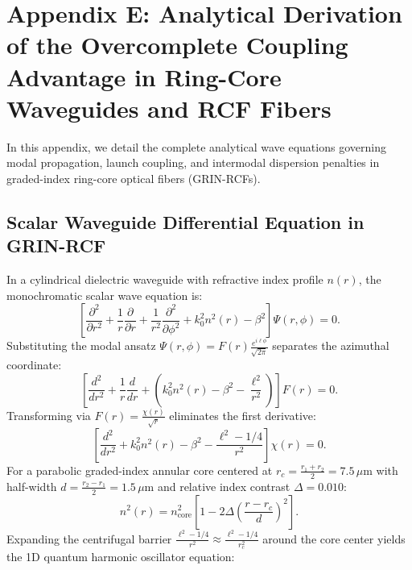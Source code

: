 \documentclass[11pt,a4paper]{article}
\begin{document}
\section{Appendix E: Analytical Derivation of the Overcomplete Coupling Advantage in Ring-Core Waveguides and RCF Fibers}
\label{app:waveguide}

In this appendix, we detail the complete analytical wave equations governing modal propagation, launch coupling, and intermodal dispersion penalties in graded-index ring-core optical fibers (GRIN-RCFs).

\subsection{Scalar Waveguide Differential Equation in GRIN-RCF}

In a cylindrical dielectric waveguide with refractive index profile $n(r)$, the monochromatic scalar wave equation is:
\begin{equation}
\left[ \frac{\partial^2}{\partial r^2} + \frac{1}{r} \frac{\partial}{\partial r} + \frac{1}{r^2} \frac{\partial^2}{\partial \phi^2} + k_0^2 n^2(r) - \beta^2 \right] \Psi(r, \phi) = 0.
\label{eq:app_scalar_helmholtz}
\end{equation}
Substituting the modal ansatz $\Psi(r, \phi) = F(r) \frac{e^{i \ell \phi}}{\sqrt{2\pi}}$ separates the azimuthal coordinate:
\begin{equation}
\left[ \frac{d^2}{dr^2} + \frac{1}{r} \frac{d}{dr} + \left( k_0^2 n^2(r) - \beta^2 - \frac{\ell^2}{r^2} \right) \right] F(r) = 0.
\label{eq:app_radial_helmholtz}
\end{equation}
Transforming via $F(r) = \frac{\chi(r)}{\sqrt{r}}$ eliminates the first derivative:
\begin{equation}
\left[ \frac{d^2}{dr^2} + k_0^2 n^2(r) - \beta^2 - \frac{\ell^2 - 1/4}{r^2} \right] \chi(r) = 0.
\label{eq:app_chi_equation}
\end{equation}
For a parabolic graded-index annular core centered at $r_c = \frac{r_1 + r_2}{2} = 7.5\,\mu\text{m}$ with half-width $d = \frac{r_2 - r_1}{2} = 1.5\,\mu\text{m}$ and relative index contrast $\Delta = 0.010$:
\begin{equation}
n^2(r) = n_{\text{core}}^2 \left[ 1 - 2\Delta \left( \frac{r - r_c}{d} \right)^2 \right].
\label{eq:app_parabolic_profile}
\end{equation}
Expanding the centrifugal barrier $\frac{\ell^2 - 1/4}{r^2} \approx \frac{\ell^2 - 1/4}{r_c^2}$ around the core center yields the 1D quantum harmonic oscillator equation:
\end{document}
